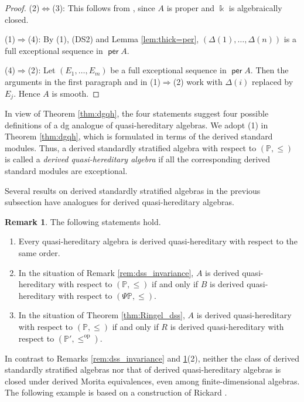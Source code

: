 \documentclass[a4paper,reqno,11pt]{amsart}
\numberwithin{equation}{section}
\theoremstyle{definition}
\newtheorem{remark}[theorem]{Remark}
\newcommand{\PP}{\mathbb{P}}
\newcommand{\bde}{\Delta}
\newcommand{\kk}{\Bbbk}
\newcommand{\op}{\mathrm{op}}
\DeclareMathOperator{\per}{\mathsf{per}}
\begin{document}
\begin{proof}
(2)$\Leftrightarrow$(3): This follows from \cite[Propositions 2.9 and 2.10]{H26}, since $A$ is proper and $\kk$ is algebraically closed.

(1)$\Rightarrow$(4): By (1), (DS2) and Lemma \ref{lem:thick=per}, $(\bde(1),\ldots,\bde(n))$ is a full exceptional sequence in $\per A$.

(4)$\Rightarrow$(2): Let $(E_{1},\ldots,E_{m})$ be a full exceptional sequence in $\per A$.
Then the arguments in the first paragraph and in (1)$\Rightarrow$(2) work with $\bde(i)$ replaced by $E_{j}$.
Hence $A$ is smooth.
\end{proof}

In view of Theorem \ref{thm:dgqh}, the four statements suggest four possible definitions of a dg analogue of quasi-hereditary algebras.
We adopt (1) in Theorem \ref{thm:dgqh}, which is formulated in terms of the derived standard modules.
Thus, a derived standardly stratified algebra with respect to $(\PP,\leq)$ is called a \emph{derived quasi-hereditary algebra} if all the corresponding derived standard modules are exceptional.

Several results on derived standardly stratified algebras in the previous subsection have analogues for derived quasi-hereditary algebras.

\begin{remark}\label{rem:dqh}
The following statements hold.
\begin{enumerate}
\item Every quasi-hereditary algebra is derived quasi-hereditary with respect to the same order.
\item In the situation of Remark \ref{rem:dss_invariance}, $A$ is derived quasi-hereditary with respect to $(\PP,\leq)$ if and only if $B$ is derived quasi-hereditary with respect to $(\Psi\PP,\leq)$.
\item In the situation of Theorem \ref{thm:Ringel_dss}, $A$ is derived quasi-hereditary with respect to $(\PP,\leq)$ if and only if $R$ is derived quasi-hereditary with respect to $(\PP',\leq^{\op})$.
\end{enumerate}
\end{remark}

In contrast to Remarks \ref{rem:dss_invariance} and \ref{rem:dqh}(2), neither the class of derived standardly stratified algebras nor that of derived quasi-hereditary algebras is closed under derived Morita equivalences, even among finite-dimensional algebras.
The following example is based on a construction of Rickard \cite{R19}.
\end{document}
